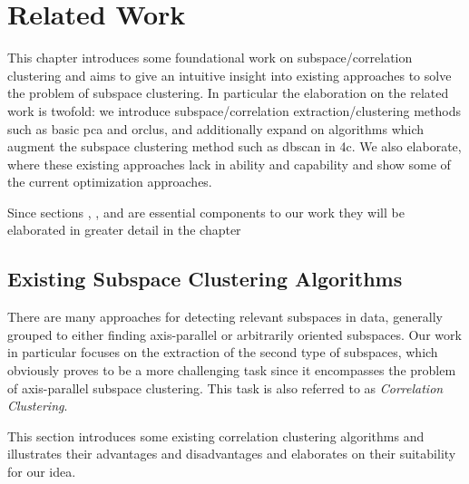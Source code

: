 \chapter{Related Work}
\label{sec:Related Work}
This chapter introduces some foundational work on subspace/correlation clustering and aims to give an intuitive insight into existing approaches to solve the problem of subspace clustering. In particular the elaboration on the related work is twofold: we introduce subspace/correlation extraction/clustering methods such as basic \acrshort{pca} and \acrshort{orclus}, and additionally expand on algorithms which augment the subspace clustering method such as \acrshort{dbscan} in \acrshort{4c}. We also elaborate, where these existing approaches lack in ability and capability and show some of the current optimization approaches.

Since sections , ,  and  are essential components to our work they will be elaborated in greater detail in the chapter 

\section{Existing Subspace Clustering Algorithms}
There are many approaches for detecting relevant subspaces in data, generally grouped to either finding axis-parallel or arbitrarily oriented subspaces. Our work in particular focuses on the extraction of the second type of subspaces, which obviously proves to be a more challenging task since it encompasses the problem of axis-parallel subspace clustering. This task is also referred to as \textit{Correlation Clustering}. 

This section introduces some existing correlation clustering algorithms and illustrates  their advantages and disadvantages and elaborates on their suitability for our idea.

